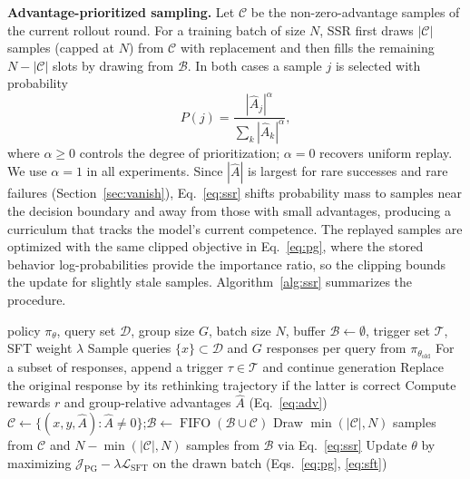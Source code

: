 \documentclass{article}
\begin{document}
\textbf{Advantage-prioritized sampling.} Let $\mathcal{C}$ be the non-zero-advantage samples of the current rollout round. For a training batch of size $N$, SSR first draws $|\mathcal{C}|$ samples (capped at $N$) from $\mathcal{C}$ with replacement and then fills the remaining $N-|\mathcal{C}|$ slots by drawing from $\mathcal{B}$. In both cases a sample $j$ is selected with probability
\begin{equation}
    P(j) = \frac{|\hat{A}_j|^{\alpha}}{\sum_{k} |\hat{A}_k|^{\alpha}},
    \label{eq:ssr}
\end{equation}
where $\alpha\ge 0$ controls the degree of prioritization; $\alpha=0$ recovers uniform replay. We use $\alpha=1$ in all experiments. Since $|\hat{A}|$ is largest for rare successes and rare failures (Section~\ref{sec:vanish}), Eq.~\eqref{eq:ssr} shifts probability mass to samples near the decision boundary and away from those with small advantages, producing a curriculum that tracks the model's current competence. The replayed samples are optimized with the same clipped objective in Eq.~\eqref{eq:pg}, where the stored behavior log-probabilities provide the importance ratio, so the clipping bounds the update for slightly stale samples. Algorithm~\ref{alg:ssr} summarizes the procedure.

\begin{algorithm}[t]
\caption{GRPO with Selective Sample Replay and Forced Rethinking}
\label{alg:ssr}
\begin{algorithmic}[1]
\Require policy $\pi_\theta$, query set $\mathcal{D}$, group size $G$, batch size $N$, buffer $\mathcal{B}\gets\emptyset$, trigger set $\mathcal{T}$, SFT weight $\lambda$
    \State Sample queries $\{x\}\subset\mathcal{D}$ and $G$ responses per query from $\pi_{\theta_\text{old}}$
        \State For a subset of responses, append a trigger $\tau\in\mathcal{T}$ and continue generation 
        \State Replace the original response by its rethinking trajectory if the latter is correct
    \EndIf
    \State Compute rewards $r$ and group-relative advantages $\hat{A}$ (Eq.~\ref{eq:adv})
    \State $\mathcal{C}\gets\{(x,y,\hat{A}) : \hat{A}\neq 0\}$;\quad $\mathcal{B}\gets\operatorname{FIFO}(\mathcal{B}\cup\mathcal{C})$
    \State Draw $\min(|\mathcal{C}|,N)$ samples from $\mathcal{C}$ and $N-\min(|\mathcal{C}|,N)$ samples from $\mathcal{B}$ via Eq.~\eqref{eq:ssr}
    \State Update $\theta$ by maximizing $\mathcal{J}_\text{PG}-\lambda\mathcal{L}_\text{SFT}$ on the drawn batch (Eqs.~\ref{eq:pg}, \ref{eq:sft})
\EndFor
\end{algorithmic}
\end{algorithm}
\end{document}
